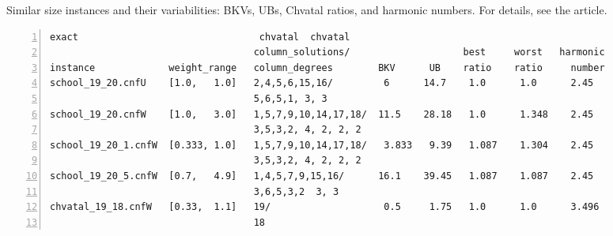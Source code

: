 \begin{table*}[h!]
\vspace*{1.9ex} 
\caption{
Similar size instances and their variabilities: BKVs, UBs, Chvatal ratios, and harmonic numbers.
For  details, see the article.
}
\label{tb_bgmc_school_19_20}
\hspace*{2.8em}
\begin{minipage}{0.85\textwidth}
\begin{Verbatim}[frame=lines, fontsize=\footnotesize,numbers=left,
numbersep=3pt,firstline=1,xleftmargin=9mm] 
                                    exact                                chvatal  chvatal  
                                    column_solutions/                    best     worst   harmonic  
instance             weight_range   column_degrees        BKV      UB    ratio    ratio     number  
school_19_20.cnfU    [1.0,   1.0]   2,4,5,6,15,16/         6      14.7    1.0      1.0      2.45
                                    5,6,5,1, 3, 3
school_19_20.cnfW    [1.0,   3.0]   1,5,7,9,10,14,17,18/  11.5    28.18   1.0      1.348    2.45      
                                    3,5,3,2, 4, 2, 2, 2
school_19_20_1.cnfW  [0.333, 1.0]   1,5,7,9,10,14,17,18/   3.833   9.39   1.087    1.304    2.45
                                    3,5,3,2, 4, 2, 2, 2    
school_19_20_5.cnfW  [0.7,   4.9]   1,4,5,7,9,15,16/      16.1    39.45   1.087    1.087    2.45
                                    3,6,5,3,2  3, 3           
chvatal_19_18.cnfW   [0.33,  1.1]   19/                    0.5     1.75   1.0      1.0      3.496 
                                    18                            
\end{Verbatim}
\end{minipage}
%
%
%
%
\vspace*{-2.5ex}
\end{table*}  

